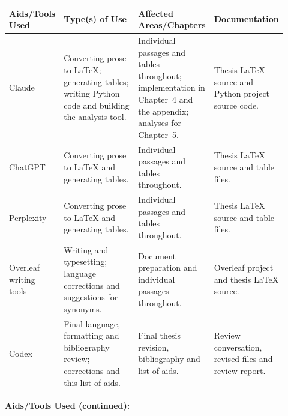 \begin{center}
\small
\setlength{\tabcolsep}{3pt}
\renewcommand{\arraystretch}{1.15}
\begin{tabular}{|p{0.15\linewidth}|p{0.32\linewidth}|p{0.22\linewidth}|p{0.23\linewidth}|}
\hline
\raggedright \textbf{Aids/Tools Used} &
\raggedright \textbf{Type(s) of Use} &
\raggedright \textbf{Affected Areas/Chapters} &
\raggedright \textbf{Documentation} \tabularnewline \hline
\raggedright Claude &
\raggedright Converting prose to \LaTeX{}; generating tables; writing Python code and
building the analysis tool. &
\raggedright Individual passages and tables throughout; implementation in Chapter~4 and
the appendix; analyses for Chapter~5. &
\raggedright Thesis \LaTeX{} source and Python project source code. \tabularnewline \hline
\raggedright ChatGPT &
\raggedright Converting prose to \LaTeX{} and generating tables. &
\raggedright Individual passages and tables throughout. &
\raggedright Thesis \LaTeX{} source and table files. \tabularnewline \hline
\raggedright Perplexity &
\raggedright Converting prose to \LaTeX{} and generating tables. &
\raggedright Individual passages and tables throughout. &
\raggedright Thesis \LaTeX{} source and table files. \tabularnewline \hline
\raggedright Overleaf writing tools &
\raggedright Writing and typesetting; language corrections and suggestions for synonyms. &
\raggedright Document preparation and individual passages throughout. &
\raggedright Overleaf project and thesis \LaTeX{} source. \tabularnewline \hline
\raggedright Codex &
\raggedright Final language, formatting and bibliography review; corrections and this
list of aids. &
\raggedright Final thesis revision, bibliography and list of aids. &
\raggedright Review conversation, revised files and review report. \tabularnewline \hline
\end{tabular}
\end{center}

\clearpage

\textbf{Aids/Tools Used (continued):}

